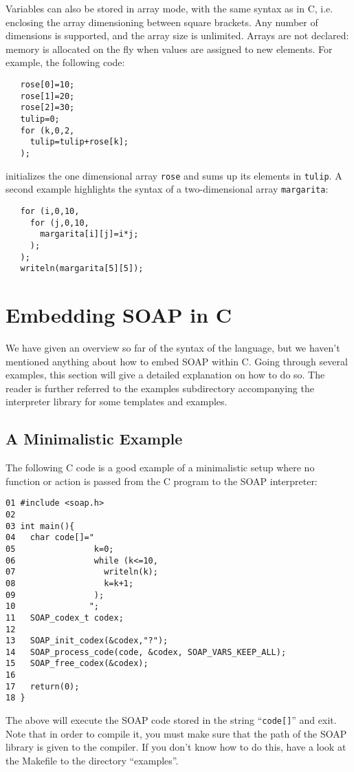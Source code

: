 \documentclass{warpdoc}
\begin{document}
Variables can also be stored in array mode, with the same syntax as in C,
i.e. enclosing the array dimensioning between square brackets. Any number of
dimensions is supported, and the array size is unlimited. Arrays
are not declared: memory is allocated on the fly when values are assigned
to new elements. For example, the following code:
%
\begin{verbatim}
   rose[0]=10;
   rose[1]=20;
   rose[2]=30;
   tulip=0;
   for (k,0,2,
     tulip=tulip+rose[k];
   );
\end{verbatim}
%
initializes the one dimensional array \verb|rose| and sums up its elements
in \verb|tulip|. A second example highlights the syntax of a two-dimensional
array \verb|margarita|:
%
\begin{verbatim}
   for (i,0,10,
     for (j,0,10,
       margarita[i][j]=i*j;
     );
   );
   writeln(margarita[5][5]);
\end{verbatim}
%



\section{Embedding SOAP in C}

We have given an overview so far of the syntax of the language,
but we haven't mentioned anything about how to embed SOAP within C.
Going through several examples,
this section will give a detailed explanation on how to do so.
The reader is further referred to the examples subdirectory accompanying
the interpreter library for some templates and examples.


\subsection{A Minimalistic Example}

The following C code is a good example of a minimalistic setup
where no function or action is passed from the C program to
the SOAP interpreter:
%
\begin{verbatim}
01 #include <soap.h>
02
03 int main(){
04   char code[]="
05                k=0;
06                while (k<=10,
07                  writeln(k);
08                  k=k+1;
09                );
10               ";
11   SOAP_codex_t codex;
12
13   SOAP_init_codex(&codex,"?");
14   SOAP_process_code(code, &codex, SOAP_VARS_KEEP_ALL);
15   SOAP_free_codex(&codex);
16
17   return(0);
18 }
\end{verbatim}
%
The above will execute the SOAP code stored in the string ``\verb|code[]|''
and exit. Note that in order to compile it, you must make sure that
the path of the SOAP library is given to the compiler. If you
don't know how to do this, have a look at the Makefile to the directory ``examples''.
\end{document}
